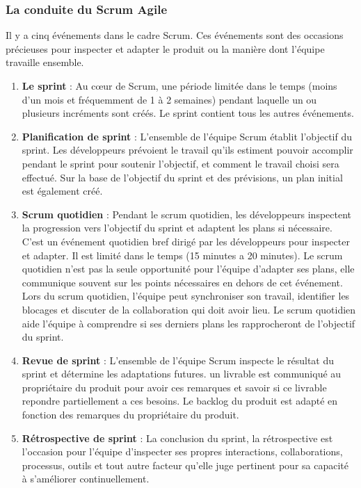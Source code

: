 \subsubsection{La conduite du Scrum Agile}
Il y a cinq événements dans le cadre Scrum. Ces événements sont des occasions précieuses pour inspecter et adapter le produit ou la manière dont l'équipe travaille ensemble.
\begin{enumerate} %
    \item \textbf{Le sprint} : Au cœur de Scrum, une période limitée dans le temps (moins d'un mois et fréquemment de 1 à 2 semaines) pendant laquelle un ou plusieurs incréments sont créés. Le sprint contient tous les autres événements.
    \item \textbf{Planification de sprint} : L'ensemble de l'équipe Scrum établit l'objectif du sprint. Les développeurs prévoient le travail qu'ils estiment pouvoir accomplir pendant le sprint pour soutenir l'objectif, et comment le travail choisi sera effectué. Sur la base de l'objectif du sprint et des prévisions, un plan initial est également créé.
    \item \textbf{Scrum quotidien} : Pendant le scrum quotidien, les développeurs inspectent la progression vers l'objectif du sprint et adaptent les plans si nécessaire. C'est un événement quotidien bref dirigé par les développeurs pour inspecter et adapter. Il est limité dans le temps (15 minutes a 20 minutes). Le scrum quotidien n'est pas la seule opportunité pour l'équipe d'adapter ses plans, elle communique souvent sur les points nécessaires en dehors de cet événement. Lors du scrum quotidien, l'équipe peut synchroniser son travail, identifier les blocages et discuter de la collaboration qui doit avoir lieu. Le scrum quotidien aide l'équipe à comprendre si ses derniers plans les rapprocheront de l'objectif du sprint.
    \item \textbf{Revue de sprint} : L'ensemble de l'équipe Scrum inspecte le résultat du sprint et détermine les adaptations futures. un livrable est communiqué au propriétaire du produit pour avoir ces remarques et savoir si ce livrable repondre partiellement a ces besoins. Le backlog du produit est adapté en fonction des remarques du propriétaire du produit.
    \item \textbf{Rétrospective de sprint} : La conclusion du sprint, la rétrospective est l'occasion pour l'équipe d'inspecter ses propres interactions, collaborations, processus, outils et tout autre facteur qu'elle juge pertinent pour sa capacité à s'améliorer continuellement.
\end{enumerate}
